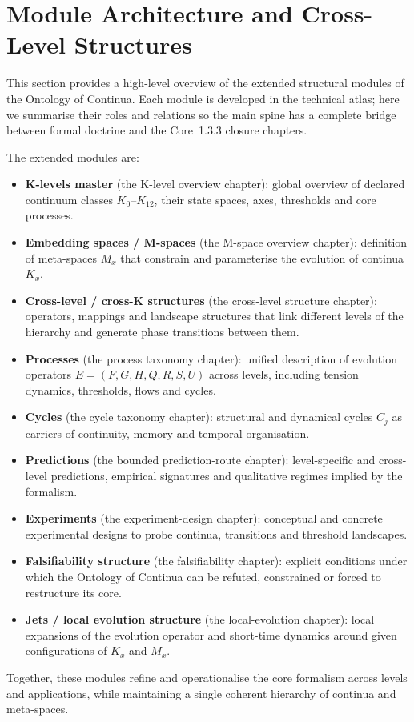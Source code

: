 
\section{Module Architecture and Cross-Level Structures}
\label{sec:modules_master}

This section provides a high-level overview of the extended structural modules
of the Ontology of Continua. Each module is developed in the technical atlas;
here we summarise their roles and relations so the main spine has a complete
bridge between formal doctrine and the Core~1.3.3 closure chapters.

The extended modules are:

\begin{itemize}
\item \textbf{K-levels master} (the K-level overview chapter):
  global overview of declared continuum classes \(K_0\)–\(K_{12}\), their state spaces,
  axes, thresholds and core processes.

\item \textbf{Embedding spaces / M-spaces} (the M-space overview chapter):
  definition of meta-spaces \(M_x\) that constrain and parameterise the
  evolution of continua \(K_x\).

\item \textbf{Cross-level / cross-K structures} (the cross-level structure chapter):
  operators, mappings and landscape structures that link different levels
  of the hierarchy and generate phase transitions between them.

\item \textbf{Processes} (the process taxonomy chapter):
  unified description of evolution operators \(E = (F,G,H,Q,R,S,U)\) across
  levels, including tension dynamics, thresholds, flows and cycles.

\item \textbf{Cycles} (the cycle taxonomy chapter):
  structural and dynamical cycles \(C_j\) as carriers of continuity,
  memory and temporal organisation.

\item \textbf{Predictions} (the bounded prediction-route chapter):
  level-specific and cross-level predictions, empirical signatures and
  qualitative regimes implied by the formalism.

\item \textbf{Experiments} (the experiment-design chapter):
  conceptual and concrete experimental designs to probe continua,
  transitions and threshold landscapes.

\item \textbf{Falsifiability structure} (the falsifiability chapter):
  explicit conditions under which the Ontology of Continua can be
  refuted, constrained or forced to restructure its core.

\item \textbf{Jets / local evolution structure} (the local-evolution chapter):
  local expansions of the evolution operator and short-time dynamics
  around given configurations of \(K_x\) and \(M_x\).
\end{itemize}

Together, these modules refine and operationalise the core formalism across
levels and applications, while maintaining a single coherent hierarchy of
continua and meta-spaces.
